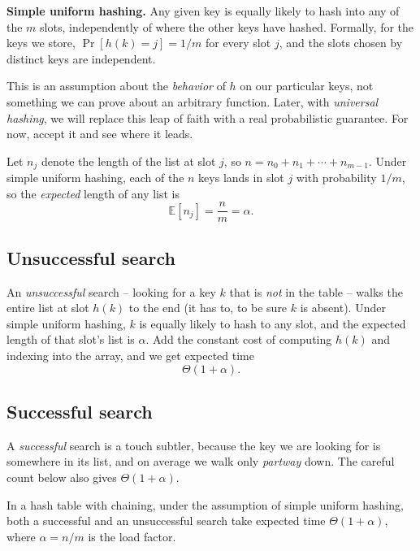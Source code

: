 \begin{formalbox}
\textbf{Simple uniform hashing.} Any given key is equally likely to hash into any of the $m$ slots, independently of where the other keys have hashed. Formally, for the keys we store, $\Pr[h(k) = j] = 1/m$ for every slot $j$, and the slots chosen by distinct keys are independent.
\end{formalbox}

This is an assumption about the \emph{behavior} of $h$ on our particular keys, not something we can prove about an arbitrary function. Later, with \emph{universal hashing}, we will replace this leap of faith with a real probabilistic guarantee. For now, accept it and see where it leads.

Let $n_j$ denote the length of the list at slot $j$, so $n = n_0 + n_1 + \cdots + n_{m-1}$. Under simple uniform hashing, each of the $n$ keys lands in slot $j$ with probability $1/m$, so the \emph{expected} length of any list is
\[
  \mathbb{E}[n_j] = \frac{n}{m} = \alpha.
\]

\subsection{Unsuccessful search}

An \emph{unsuccessful} search -- looking for a key $k$ that is \emph{not} in the table -- walks the entire list at slot $h(k)$ to the end (it has to, to be sure $k$ is absent). Under simple uniform hashing, $k$ is equally likely to hash to any slot, and the expected length of that slot's list is $\alpha$. Add the constant cost of computing $h(k)$ and indexing into the array, and we get expected time
\[
  \Theta(1 + \alpha).
\]

\subsection{Successful search}

A \emph{successful} search is a touch subtler, because the key we are looking for is somewhere in its list, and on average we walk only \emph{partway} down. The careful count below also gives $\Theta(1 + \alpha)$.

\begin{theorem}
\label{ch11:chaining-theorem}
In a hash table with chaining, under the assumption of simple uniform hashing, both a successful and an unsuccessful search take expected time $\Theta(1 + \alpha)$, where $\alpha = n/m$ is the load factor.
\end{theorem}

